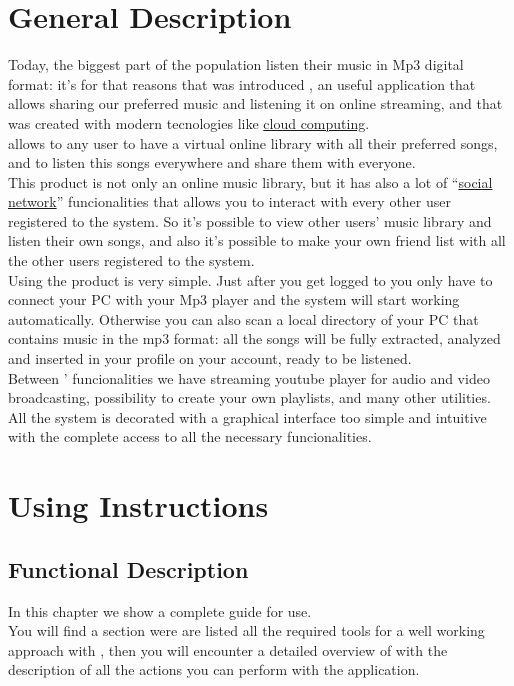 \chapter{General Description}
\thispagestyle{fancy}
Today, the biggest part of the population listen their music in Mp3 digital
format: it's for that reasons that was introduced , an useful
application that allows sharing our preferred music and listening it on online
streaming, and that was created with modern tecnologies like \underline{cloud
computing}.\\

 allows to any user to have a virtual online library with all their
preferred songs, and to listen this songs everywhere and share them with
everyone.\\

This product is not only an online music library, but it has also a lot of
``\underline{social network}'' funcionalities that allows you to interact with every other user
registered to the system. So it's possible to view other users' music library
and listen their own songs, and also it's possible to make your own friend list
with all the other users registered to the system.\\

Using the product is very simple. Just after you get logged to  you
only have to connect your PC with your Mp3 player and the system will start
working automatically. Otherwise you can also scan a local directory of your PC
that contains music in the mp3 format: all the songs will be fully extracted,
analyzed and inserted in your profile on your  account, ready to be
listened.\\

Between ' funcionalities we have streaming youtube player for audio
and video broadcasting, possibility to create your own playlists, and many other
utilities.\\

All the system is decorated with a graphical interface  too simple and intuitive
with the complete access to all the necessary funcionalities.\\


\chapter{Using Instructions}
\thispagestyle{fancy}

\section{Functional Description}
In this chapter we show a complete guide for  use.\\
You will find a section were are listed all the required tools for a well
working approach with , then you will encounter a detailed overview
of  with the description of all the actions you can perform with the
application.

